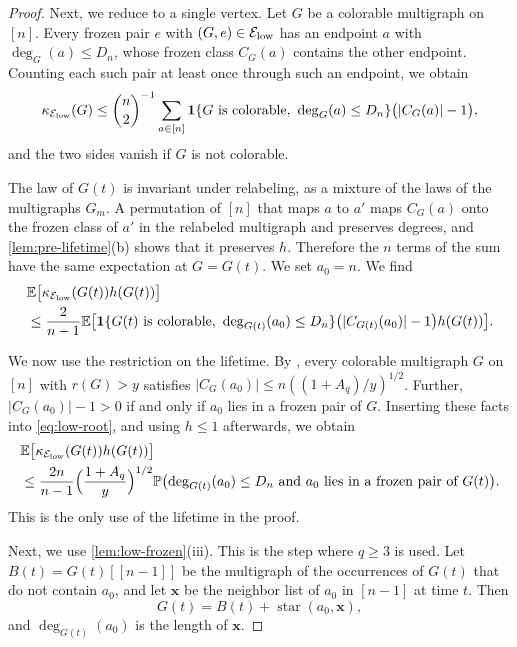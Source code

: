 \begin{proof}
Next, we reduce to a single vertex. Let $G$ be a colorable multigraph on $[n]$. Every frozen pair $e$ with $(G, e) \in \mathcal E_{\rm low}$ has an endpoint $a$ with $\deg_G(a) \le D_n$, whose frozen class $C_G(a)$ contains the other endpoint. Counting each such pair at least once through such an endpoint, we obtain
\begin{equation*}
\kappa_{\mathcal E_{\rm low}}(G) \le \binom{n}{2}^{-1} \sum_{a \in [n]} \mathbf 1\{G \text{ is colorable}, \ \deg_G(a) \le D_n\} \bigl(|C_G(a)| - 1\bigr),
\end{equation*}
and the two sides vanish if $G$ is not colorable.

The law of $G(t)$ is invariant under relabeling, as a mixture of the laws of the multigraphs $G_m$. A permutation of $[n]$ that maps $a$ to $a'$ maps $C_G(a)$ onto the frozen class of $a'$ in the relabeled multigraph and preserves degrees, and \cref{lem:pre-lifetime}(b) shows that it preserves $h$. Therefore the $n$ terms of the sum have the same expectation at $G = G(t)$. We set $a_0 = n$. We find
\begin{equation}\label{eq:low-root}
\begin{aligned}
&\E\bigl[\kappa_{\cE_{\rm low}}(G(t)) h(G(t))\bigr] \\
&\le \frac{2}{n - 1} \E\bigl[\ind\{G(t) \text{ is colorable}, \ \deg_{G(t)}(a_0) \le D_n\} \bigl(|C_{G(t)}(a_0)| - 1\bigr) h(G(t))\bigr].
\end{aligned}
\end{equation}

We now use the restriction on the lifetime. By , every colorable multigraph $G$ on $[n]$ with $r(G) > y$ satisfies $|C_G(a_0)| \le n ((1 + A_q)/y)^{1/2}$. Further, $|C_G(a_0)| - 1 > 0$ if and only if $a_0$ lies in a frozen pair of $G$. Inserting these facts into \eqref{eq:low-root}, and using $h \le 1$ afterwards, we obtain
\begin{equation}\label{eq:low-classmass}
\begin{aligned}
&\mathbb E\bigl[\kappa_{\mathcal E_{\rm low}}(G(t)) h(G(t))\bigr] \\
&\le \frac{2n}{n - 1} \Bigl(\frac{1 + A_q}{y}\Bigr)^{1/2} \mathbb P\bigl(\deg_{G(t)}(a_0) \le D_n \text{ and } a_0 \text{ lies in a frozen pair of } G(t)\bigr).
\end{aligned}
\end{equation}
This is the only use of the lifetime in the proof.

Next, we use \cref{lem:low-frozen}(iii). This is the step where $q \ge 3$ is used. Let $B(t) = G(t)[[n - 1]]$ be the multigraph of the occurrences of $G(t)$ that do not contain $a_0$, and let $\mathbf x$ be the neighbor list of $a_0$ in $[n - 1]$ at time $t$. Then
\begin{equation*}
G(t) = B(t) + \operatorname{star}(a_0, \mathbf x),
\end{equation*}
and $\deg_{G(t)}(a_0)$ is the length of $\mathbf x$.


\end{proof}
